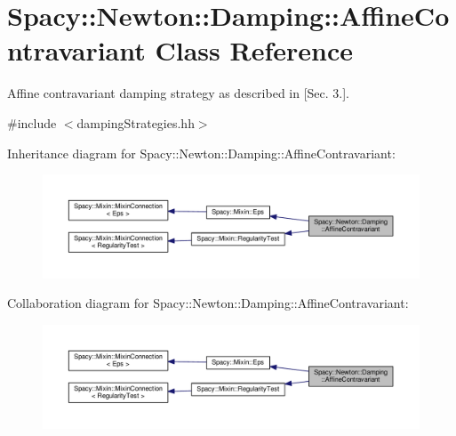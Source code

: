 \hypertarget{classSpacy_1_1Newton_1_1Damping_1_1AffineContravariant}{\section{Spacy\-:\-:Newton\-:\-:Damping\-:\-:Affine\-Contravariant Class Reference}
\label{classSpacy_1_1Newton_1_1Damping_1_1AffineContravariant}
}


Affine contravariant damping strategy as described in \cite{Deuflhard2004} \mbox{[}Sec. 3.\mbox{]}.  




{\ttfamily \#include $<$damping\-Strategies.\-hh$>$}



Inheritance diagram for Spacy\-:\-:Newton\-:\-:Damping\-:\-:Affine\-Contravariant\-:
\nopagebreak
\begin{figure}[H]
\begin{center}
\leavevmode
\includegraphics[width=350pt]{classSpacy_1_1Newton_1_1Damping_1_1AffineContravariant__inherit__graph}
\end{center}
\end{figure}


Collaboration diagram for Spacy\-:\-:Newton\-:\-:Damping\-:\-:Affine\-Contravariant\-:
\nopagebreak
\begin{figure}[H]
\begin{center}
\leavevmode
\includegraphics[width=350pt]{classSpacy_1_1Newton_1_1Damping_1_1AffineContravariant__coll__graph}
\end{center}
\end{figure}
